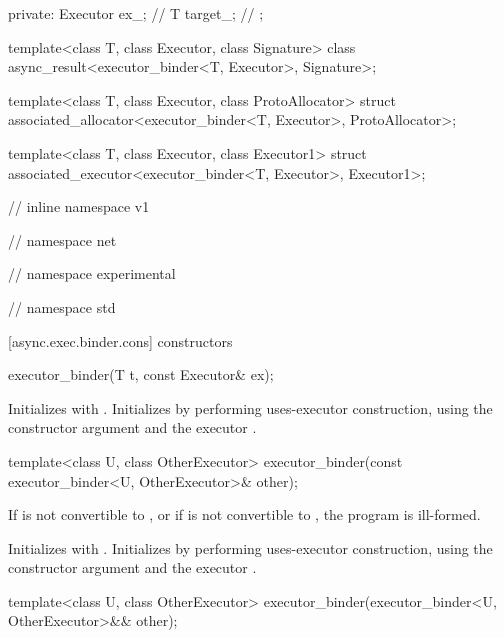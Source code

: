 \begin{codeblock}
{{{{{  private:
    Executor ex_; // \expos
    T target_; // \expos
  };

  template<class T, class Executor, class Signature>
    class async_result<executor_binder<T, Executor>, Signature>;

  template<class T, class Executor, class ProtoAllocator>
    struct associated_allocator<executor_binder<T, Executor>, ProtoAllocator>;

  template<class T, class Executor, class Executor1>
    struct associated_executor<executor_binder<T, Executor>, Executor1>;

} // inline namespace v1
} // namespace net
} // namespace experimental
} // namespace std
\end{codeblock}


[async.exec.binder.cons]{ constructors}

%
\begin{itemdecl}
executor_binder(T t, const Executor& ex);
\end{itemdecl}

\begin{itemdescr}
\pnum
\effects Initializes  with . Initializes  by performing uses-executor construction, using the constructor argument  and the executor .
\end{itemdescr}

\begin{itemdecl}
template<class U, class OtherExecutor>
  executor_binder(const executor_binder<U, OtherExecutor>& other);
\end{itemdecl}

\begin{itemdescr}
\pnum
\requires If  is not convertible to , or if  is not convertible to , the program is ill-formed.

\pnum
\effects Initializes  with . Initializes  by performing uses-executor construction, using the constructor argument  and the executor .
\end{itemdescr}

\begin{itemdecl}
template<class U, class OtherExecutor>
  executor_binder(executor_binder<U, OtherExecutor>&& other);
\end{itemdecl}

